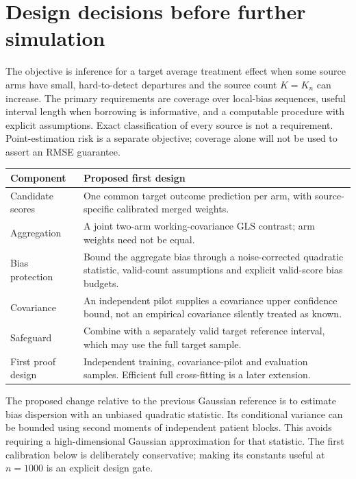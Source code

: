 \section{Design decisions before further simulation}

The objective is inference for a target average treatment effect when some
source arms have small, hard-to-detect departures and the source count
$K=K_n$ can increase. The primary requirements are coverage over local-bias
sequences, useful interval length when borrowing is informative, and a
computable procedure with explicit assumptions. Exact classification of every
source is not a requirement. Point-estimation risk is a separate objective;
coverage alone will not be used to assert an RMSE guarantee.

\begin{center}
\begin{tabular}{@{}p{.24\linewidth}p{.69\linewidth}@{}}
\toprule
Component & Proposed first design\\
\midrule
Candidate scores & One common target outcome prediction per arm, with
source-specific calibrated merged weights.\\
Aggregation & A joint two-arm working-covariance GLS contrast; arm weights
need not be equal.\\
Bias protection & Bound the aggregate bias through a noise-corrected quadratic
statistic, valid-count assumptions and explicit valid-score bias budgets.\\
Covariance & An independent pilot supplies a covariance upper confidence bound,
not an empirical covariance silently treated as known.\\
Safeguard & Combine with a separately valid target reference interval, which
may use the full target sample.\\
First proof design & Independent training, covariance-pilot and evaluation
samples. Efficient full cross-fitting is a later extension.\\
\bottomrule
\end{tabular}
\end{center}

The proposed change relative to the previous Gaussian reference is to estimate
bias dispersion with an unbiased quadratic statistic. Its conditional
variance can be bounded using second moments of independent patient blocks.
This avoids requiring a high-dimensional Gaussian approximation for that
statistic. The first calibration below is deliberately conservative; making
its constants useful at $n=1000$ is an explicit design gate.

